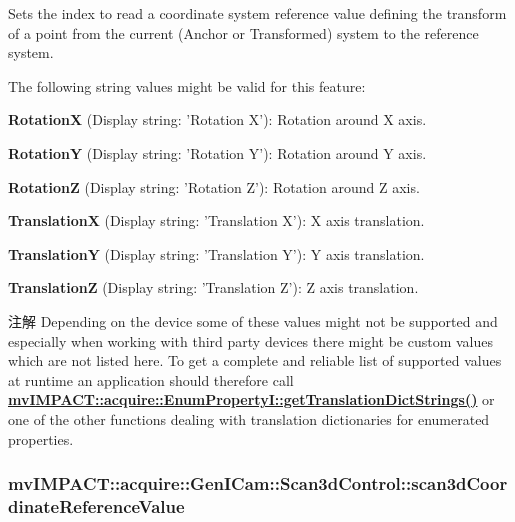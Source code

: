 Sets the index to read a coordinate system reference value defining the transform of a point from the current (Anchor or Transformed) system to the reference system.

The following string values might be valid for this feature\+:
\begin{DoxyItemize}
\item {\bfseries Rotation\+X} (Display string\+: 'Rotation X')\+: Rotation around X axis.
\item {\bfseries Rotation\+Y} (Display string\+: 'Rotation Y')\+: Rotation around Y axis.
\item {\bfseries Rotation\+Z} (Display string\+: 'Rotation Z')\+: Rotation around Z axis.
\item {\bfseries Translation\+X} (Display string\+: 'Translation X')\+: X axis translation.
\item {\bfseries Translation\+Y} (Display string\+: 'Translation Y')\+: Y axis translation.
\item {\bfseries Translation\+Z} (Display string\+: 'Translation Z')\+: Z axis translation.
\end{DoxyItemize}

\begin{DoxyNote}{注解}
Depending on the device some of these values might not be supported and especially when working with third party devices there might be custom values which are not listed here. To get a complete and reliable list of supported values at runtime an application should therefore call {\bfseries \hyperlink{classmv_i_m_p_a_c_t_1_1acquire_1_1_enum_property_i_a0ba6ccbf5ee69784d5d0b537924d26b6}{mv\+I\+M\+P\+A\+C\+T\+::acquire\+::\+Enum\+Property\+I\+::get\+Translation\+Dict\+Strings()}} or one of the other functions dealing with translation dictionaries for enumerated properties. 
\end{DoxyNote}
\hypertarget{classmv_i_m_p_a_c_t_1_1acquire_1_1_gen_i_cam_1_1_scan3d_control_ae70e808138fa8cc06015ca25aeff21c5}{
\subsubsection[{scan3d\+Coordinate\+Reference\+Value}]{ mv\+I\+M\+P\+A\+C\+T\+::acquire\+::\+Gen\+I\+Cam\+::\+Scan3d\+Control\+::scan3d\+Coordinate\+Reference\+Value}}\label{classmv_i_m_p_a_c_t_1_1acquire_1_1_gen_i_cam_1_1_scan3d_control_ae70e808138fa8cc06015ca25aeff21c5}


